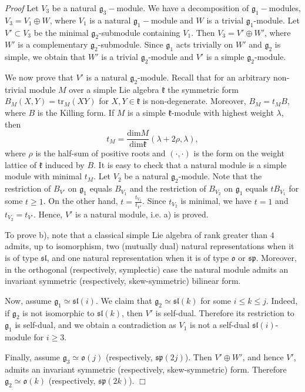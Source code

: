 \documentclass{svmult}
\renewenvironment{proof}{ \emph{Proof}}{$\Box$}
\renewcommand{\sp}{\mathfrak{sp}}
\renewcommand{\sl}{\mathfrak{sl}}
\newcommand{\kk}{\mathfrak{k}}
\newcommand{\oo}{\mathfrak{o}}
\renewcommand{\gg}{\mathfrak{g}}
\begin{document}
\begin{proof} Let $V_3$ be a natural $\gg_3-$module. We have a
  decomposition of $\gg_1-$modules, $V_3=V_1\oplus W$, where 
$V_1$ is a natural 
$\gg_1-$module and $W$ is a trivial $\gg_1$-module. Let $V'\subset
  V_3$ be the minimal $\gg_2$-submodule containing $V_1$. Then 
$V_3=V'\oplus W'$, where $W'$ 
is a complementary $\gg_2$-submodule. Since $\gg_1$ acts trivially on $W'$ and $\gg_2$ is simple, we obtain that $W'$ is a trivial $\gg_2$-module and $V'$ is a 
simple $\gg_2$-module. 

We now prove that $V'$ is a natural $\gg_2$-module. Recall that for an arbitrary non-trivial
module $M$ over a simple Lie algebra $\kk$ the symmetric form $B_M(X,Y)=\mathrm{tr}_M(XY)$ for $X,Y\in \kk$ is non-degenerate. 
Moreover, $B_M=t_MB$, where $B$ is the Killing form. If $M$ is a
simple $\kk$-module with highest weight $\lambda$, then 
$$t_M=\frac{\mathrm{dim}M}{\mathrm{dim}\kk}(\lambda+2\rho,\lambda),$$
where $\rho$ is the half-sum of positive roots and $(\cdot,\cdot)$ is
the form on the weight lattice of $\kk$ induced by $B$. 
It is easy to check that a natural module is a simple module with minimal $t_M$.
Let $V_2$ be a natural $\gg_2$-module. Note that the restriction of $B_{V'}$ on $\gg_1$ equals $B_{V_1}$ and the restriction of
$B_{V_2}$ on $\gg_1$ equals $tB_{V_1}$ for some $t\geq 1$. On the
other hand, $t=\frac{t_{V_2}}{t_{V'}}$. Since 
$t_{V_2}$ is minimal, we have
$t=1$ and $t_{V_2}=t_{V'}$. Hence, $V'$ is a natural module, i.e. a) is proved.

To prove b), note that a classical simple Lie algebra of rank greater than $4$ admits, up to isomorphism, two (mutually dual) 
natural representations when it is of type $\sl$, and one natural representation when it is of type $\oo$ or $\sp$. Moreover, 
in the orthogonal (respectively, symplectic) case the natural module admits 
an invariant symmetric (respectively, skew-symmetric) bilinear form.

Now, assume $\gg_1\simeq \sl(i)$. We claim that $\gg_2\simeq \sl(k)$ for some $i\leq k\leq j$.
Indeed, if $\gg_2$ is not isomorphic to $\sl(k)$, then $V'$ is self-dual. Therefore its restriction 
to $\gg_1$ is self-dual, and we obtain a contradiction as $V_1$ is not a self-dual $\sl(i)$-module for $i\geq 3$.

Finally, assume $\gg_3\simeq \oo(j)$ (respectively, $\sp(2j)$). Then $V'\oplus W'$, and hence $V'$, admits an invariant symmetric 
(respectively, skew-symmetric) form. Therefore $\gg_2\simeq \oo(k)$ (respectively, $\sp(2k)$).
\end{proof}
\end{document}
